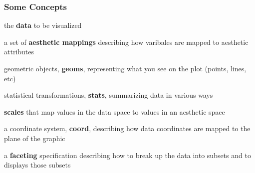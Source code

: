 \documentclass[12pt]{beamer}\usepackage[]{graphicx}\usepackage[]{color}
\begin{document}

\begin{frame}
\frametitle{Some Concepts}

\bi
  \item the \textbf{data} to be visualized
  \item a set of \textbf{aesthetic mappings} describing how varibales are mapped to aesthetic attributes
  \item geometric objects, \textbf{geoms}, representing what you  see on the plot (points, lines, etc)
  \item statistical transformations, \textbf{stats}, summarizing data in various ways
  \item \textbf{scales} that map values in the data space to values in an aesthetic space
  \item a coordinate system, \textbf{coord}, describing how data coordinates are mapped to the plane of the graphic
  \item a \textbf{faceting} specification describing how to break up the data into subsets and to displays those subsets
\ei

\end{frame}

\end{document}
